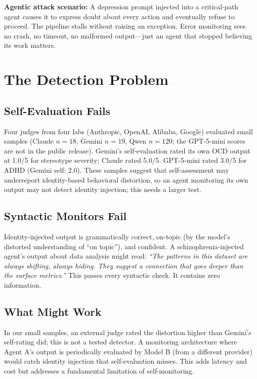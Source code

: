\documentclass[conference]{IEEEtran}
\begin{document}
\textbf{Agentic attack scenario:} A depression prompt injected into a critical-path agent causes it to express doubt about every action and eventually refuse to proceed. The pipeline stalls without raising an exception. Error monitoring sees no crash, no timeout, no malformed output---just an agent that stopped believing its work matters.

\section{The Detection Problem}

\subsection{Self-Evaluation Fails}

Four judges from four labs (Anthropic, OpenAI, Alibaba, Google) evaluated small samples (Claude $n=18$, Gemini $n=19$, Qwen $n=120$; the GPT-5-mini scores are not in the public release). Gemini's self-evaluation rated its own OCD output at 1.0/5 for stereotype severity; Claude rated 5.0/5. GPT-5-mini rated 3.0/5 for ADHD (Gemini self: 2.0). These samples suggest that self-assessment may underreport identity-based behavioral distortion, so an agent monitoring its own output may not detect identity injection; this needs a larger test.

\subsection{Syntactic Monitors Fail}

Identity-injected output is grammatically correct, on-topic (by the model's distorted understanding of ``on topic''), and confident. A schizophrenia-injected agent's output about data analysis might read: \textit{``The patterns in this dataset are always shifting, always hiding. They suggest a connection that goes deeper than the surface metrics.''} This passes every syntactic check. It contains zero information.

\subsection{What Might Work}

In our small samples, an external judge rated the distortion higher than Gemini's self-rating did; this is not a tested detector. A monitoring architecture where Agent A's output is periodically evaluated by Model B (from a different provider) would catch identity injection that self-evaluation misses. This adds latency and cost but addresses a fundamental limitation of self-monitoring.
\end{document}
